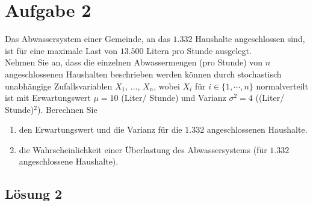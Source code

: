 \documentclass[main.tex]{subfiles}
\begin{document}
\section{Aufgabe 2}
Das Abwassersystem einer Gemeinde, an das $1.332$ Haushalte angeschlossen sind, ist für eine maximale Last von $13.500$ Litern pro Stunde ausgelegt. \\[1mm]
Nehmen Sie an, dass die einzelnen Abwassermengen (pro Stunde) von $n$ angeschlossenen Haushalten beschrieben werden können durch stochastisch unabhängige Zufallsvariablen $X_1$, ..., $X_n$, wobei $X_i$ für $i \in \{ 1, \cdots, n \}$ normalverteilt ist mit Erwartungswert $\mu = 10$ (Liter/ Stunde) und Varianz $\sigma^2 = 4$ ((Liter/ Stunde)$^2$). Berechnen Sie 
\begin{enumerate}
\item den Erwartungswert und die Varianz für die $1.332$ angeschlossenen Haushalte.
\item die Wahrscheinlichkeit einer Überlastung des Abwassersystems (für $1.332$ angeschlossene Haushalte).
\end{enumerate}

\subsection{Lösung 2}
\end{document}
